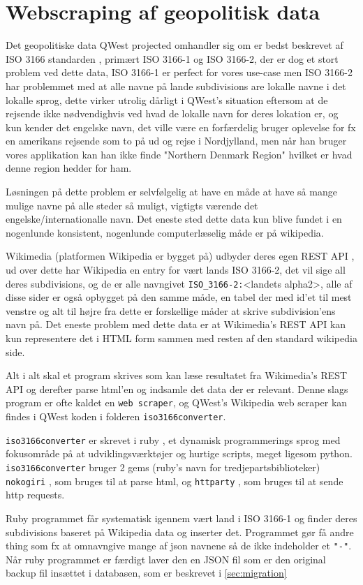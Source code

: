 \section{Webscraping af geopolitisk data}\label{sec:datascraping}
Det geopolitiske data QWest projected omhandler sig om er bedst beskrevet af ISO 3166 standarden \cite{ISO3166}, primært ISO 3166-1 og ISO 3166-2, der er dog et stort problem ved dette data, ISO 3166-1 er perfect for vores use-case men ISO 3166-2 har problemmet med at alle navne på lande subdivisions are lokalle navne i det lokalle sprog, dette virker utrolig dårligt i QWest's situation eftersom at de rejsende ikke nødvendighvis ved hvad de lokalle navn for deres lokation er, og kun kender det engelske navn, det ville være en forfærdelig bruger oplevelse for fx en amerikans rejsende som to på ud og rejse i Nordjylland, men når han bruger vores applikation kan han ikke finde "Northern Denmark Region" hvilket er hvad denne region hedder for ham.

Løsningen på dette problem er selvfølgelig at have en måde at have så mange mulige navne på alle steder så muligt, vigtigts værende det engelske/internationalle navn. Det eneste sted dette data kun blive fundet i en nogenlunde konsistent, nogenlunde computerlæselig måde er på wikipedia.

Wikimedia (platformen Wikipedia er bygget på) udbyder deres egen REST API \cite{Wikimedia-REST-API-Documentation}, ud over dette har Wikipedia en entry for vært lands ISO 3166-2, det vil sige all deres subdivisions, og de er alle navngivet \texttt{ISO\_3166-2:}<landets alpha2>, alle af disse sider er også opbygget på den samme måde, en tabel der med id'et til mest venstre og alt til højre fra dette er forskellige måder at skrive subdivision'ens navn på. Det eneste problem med dette data er at Wikimedia's REST API kan kun representere det i HTML form sammen med resten af den standard wikipedia side.

Alt i alt skal et program skrives som kan læse resultatet fra Wikimedia's REST API og derefter parse html'en og indsamle det data der er relevant. 
Denne slags program er ofte kaldet en \texttt{web scraper}, og QWest's Wikipedia web scraper kan findes i QWest koden i folderen \texttt{iso3166converter}.

\texttt{iso3166converter} er skrevet i ruby \cite{RubyLang}, et dynamisk programmerings sprog med fokusområde på at udviklingsværktøjer og hurtige scripts, meget ligesom python. \texttt{iso3166converter} bruger 2 gems (ruby's navn for tredjepartsbiblioteker) \texttt{nokogiri} \cite{nokogiri}, som bruges til at parse html, og \texttt{httparty} \cite{httparty}, som bruges til at sende http requests.

Ruby programmet får systematisk igennem vært land i ISO 3166-1 og finder deres subdivisions baseret på Wikipedia data og inserter det. Programmet gør få andre thing som fx at omnavngive mange af json navnene så de ikke indeholder et \texttt{"-"}. Når ruby programmet er færdigt laver den en JSON fil som er den original backup fil insættet i databasen, som er beskrevet i \ref{sec:migration}